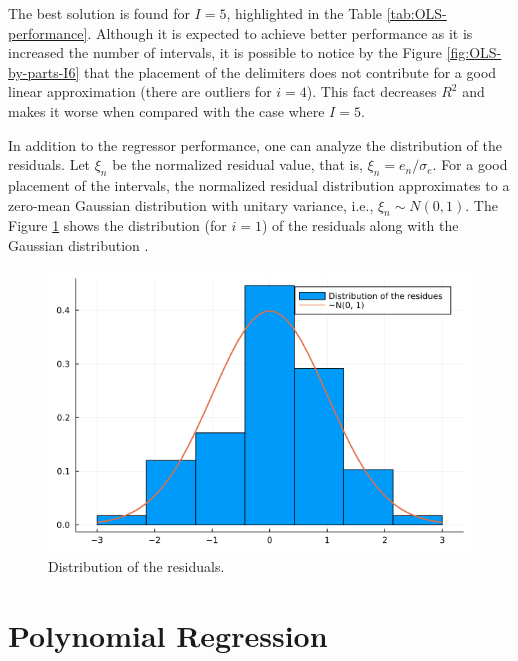 \documentclass[english]{sobraep}
\begin{document}
The best solution is found for \(I=5\), highlighted in the Table \ref{tab:OLS-performance}. Although it is expected to achieve better performance as it is increased the number of intervals, it is possible to notice by the Figure \ref{fig:OLS-by-parts-I6} that the placement of the delimiters does not contribute for a good linear approximation (there are outliers for \(i=4\)). This fact decreases \(R^2\) and makes it worse when compared with the case where \(I=5\).

In addition to the regressor performance, one can analyze the distribution of the residuals. Let \(\xi_n\) be the normalized residual value, that is, \(\xi_n = e_n/\sigma_e\). For a good placement of the intervals, the normalized residual distribution approximates to a zero-mean Gaussian distribution with unitary variance, i.e., \(\xi_n \sim N(0, 1)\). The Figure \ref{fig:distribution} shows the distribution (for \(i=1\)) of the residuals along with the Gaussian distribution \cite{leon1994probability}.

\begin{figure}
    \centering
    \includegraphics[scale=0.35]{../figs/OLS-by-parts/residues_PDF_I5i1.png}
    \caption{Distribution of the residuals.}
    \label{fig:distribution}
\end{figure}

\section{Polynomial Regression}
\end{document}
